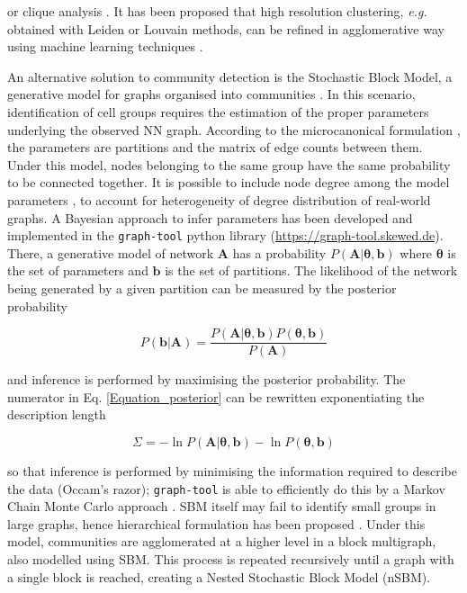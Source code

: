 \documentclass[10pt]{article}
\begin{document}
\cite{baran_2019, Tang_Sackton_2020} or clique analysis \cite{xu_2015}. It has been proposed that high resolution clustering, \emph{e.g.} obtained with Leiden or Louvain methods, can be refined in agglomerative way using machine learning techniques \cite{miao_2020}.

An alternative solution to community detection is the Stochastic Block Model, a generative model for graphs organised into communities \cite{holland_1983}. In this scenario, identification of cell groups requires the estimation of the proper parameters underlying the observed NN graph. According to the microcanonical formulation \cite{peixoto_2017}, the parameters are partitions and the matrix of edge counts between them. Under this model, nodes belonging to the same group have the same probability to be connected together. It is possible to include node degree among the model parameters \cite{karrer_2011}, to account for heterogeneity of degree distribution of real-world graphs. A Bayesian approach to infer parameters has been developed \cite{peixoto_2013} and implemented in the \texttt{graph-tool} python library (\href{https://graph-tool.skewed.de}{https:/\slash graph-tool.skewed.de}). There, a generative model of network $\boldsymbol A$ has a probability $P(\boldsymbol A|\boldsymbol\theta, \boldsymbol b)$ where \textbf{$\boldsymbol\theta$} is the set of parameters and \textbf{\emph{$\boldsymbol b$}} is the set of partitions. The likelihood of the network being generated by a given partition can be measured by the posterior probability


\begin{equation}
P(\boldsymbol b | \boldsymbol A) = \frac{P(\boldsymbol A|\boldsymbol\theta, \boldsymbol b)P(\boldsymbol\theta, \boldsymbol b)}{P(\boldsymbol A)}
\label{Equation_posterior}
\end{equation}

and inference is performed by maximising the posterior probability. The numerator in Eq. \ref{Equation_posterior} can be rewritten exponentiating the description length

\begin{equation}
\Sigma = -\ln P(\boldsymbol A|\boldsymbol\theta, \boldsymbol b) - \ln P(\boldsymbol\theta, \boldsymbol b)
\label{Equation_entropy}
\end{equation}

so that inference is performed by minimising the information required to describe the data (Occam's razor); \texttt{graph-tool} is able to efficiently do this by a Markov Chain Monte Carlo approach \cite{peixoto_2014}. SBM itself may fail to identify small groups in large graphs, hence hierarchical formulation has been proposed \cite{peixoto_2014_h}. Under this model, communities are agglomerated at a higher level in a block multigraph, also modelled using SBM. This process is repeated recursively until a graph with a single block is reached, creating a Nested Stochastic Block Model (nSBM).
\end{document}
